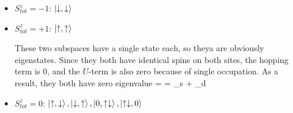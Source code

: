 \documentclass[12pt]{article}
\begin{document}
\begin{itemize}
\item \(S_{tot}^z = -1\): \(\ket{\downarrow,\downarrow}\)
\item \(S_{tot}^z = +1\): \(\ket{\uparrow,\uparrow}\)

These two subspaces have a single state each, so theya are obviously eigenstates. Since they both have identical spins on both sites, the hopping term is 0, and the \(U\)-term is also zero because of single occupation. As a result, they both have zero eigenvalue
\beq
\ham \ket{\downarrow,\downarrow} = \ham \ket{\uparrow,\uparrow} = \epsilon_s + \epsilon_d
\eeq

\item \(S_{tot}^z = 0\):  \(\ket{\uparrow,\downarrow},\ket{\downarrow,\uparrow},\ket{0,\uparrow\downarrow},\ket{\uparrow\downarrow,0}\)
\end{itemize}
\end{document}
